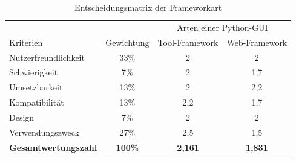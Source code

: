 \documentclass[a4paper,titlepage,halfparskip,12pt]{scrreprt}
\begin{document}
\begin{onehalfspacing}
\renewcommand{\arraystretch}{2}
\begin{table}[h]
	\centering
	\caption{Entscheidungsmatrix der Frameworkart}
	\begin{tabular}{l|c|c|c}
		& & \multicolumn{2}{c}{Arten einer Python-GUI} \\
		Kriterien & Gewichtung & Tool-Framework & Web-Framework \\
		\hline
		Nutzerfreundlichkeit & 33\% & 2 & 2 \\
		\hline
		Schwierigkeit & 7\% & 2 & 1,7  \\
		\hline
		Umsetzbarkeit & 13\% & 2 & 2,2\\
		\hline
		Kompatibilität & 13\% & 2,2 & 1,7 \\
		\hline
		Design & 7\% & 2 &  2\\
		\hline 
		Verwendungszweck & 27\% & 2,5 & 1,5 \\
		\hline
		\textbf{Gesamtwertungszahl} & \textbf{100\%} & \textbf{2,161} & \textbf{1,831} \\
	\end{tabular}
	\label{tab:EntscheidungsmatrixFrameworkart}
\end{table} \\

\end{onehalfspacing}
\end{document}
